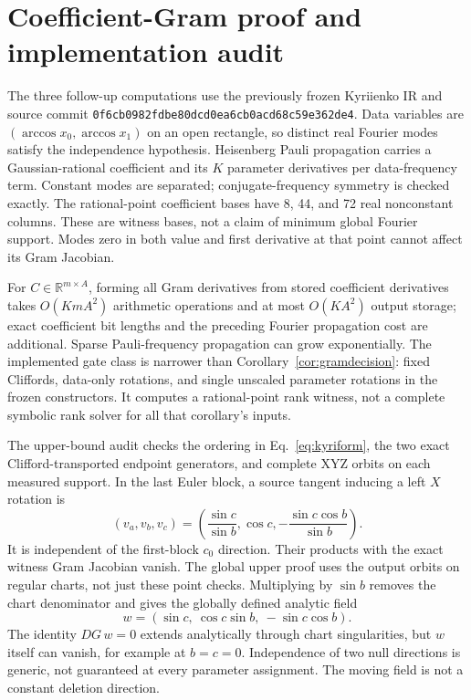 \section{Coefficient-Gram proof and implementation audit}
\label{app:gram}
The three follow-up computations use the previously frozen Kyriienko
IR and source commit \texttt{0f6cb0982fdbe80dcd0ea6cb0acd68c59e362de4}.
Data variables are $(\arccos x_0,\arccos x_1)$ on an open rectangle,
so distinct real Fourier modes satisfy the independence hypothesis.
Heisenberg Pauli propagation carries a Gaussian-rational coefficient
and its $K$ parameter derivatives per data-frequency term. Constant
modes are separated; conjugate-frequency symmetry is checked exactly.
The rational-point coefficient bases have 8, 44, and 72 real
nonconstant columns. These are witness bases, not a claim of minimum
global Fourier support. Modes zero in both value and first derivative
at that point cannot affect its Gram Jacobian.

For $C\in\mathbb R^{m\times A}$, forming all Gram derivatives from
stored coefficient derivatives takes $O(KmA^2)$ arithmetic operations
and at most $O(KA^2)$ output storage; exact coefficient bit lengths and
the preceding Fourier propagation cost are additional. Sparse
Pauli-frequency propagation can grow exponentially. The implemented
gate class is narrower than Corollary~\ref{cor:gramdecision}: fixed
Cliffords, data-only rotations, and single unscaled parameter
rotations in the frozen constructors. It computes a rational-point
rank witness, not a complete symbolic rank solver for all that
corollary's inputs.

The upper-bound audit checks the ordering in Eq.~\eqref{eq:kyriform},
the two exact Clifford-transported endpoint generators, and complete
XYZ orbits on each measured support. In the last Euler block, a
source tangent inducing a left $X$ rotation is
\begin{equation}
 (v_a,v_b,v_c)=
 \left(\frac{\sin c}{\sin b},\cos c,
       -\frac{\sin c\cos b}{\sin b}\right).
\end{equation}
It is independent of the first-block $c_0$ direction. Their products
with the exact witness Gram Jacobian vanish. The global upper proof
uses the output orbits on regular charts, not just these point checks.
Multiplying by $\sin b$ removes the chart denominator and gives the
globally defined analytic field
\begin{equation}
 w=(\sin c,\ \cos c\sin b,\ -\sin c\cos b).
\end{equation}
The identity $D G\,w=0$ extends analytically through chart singularities,
but $w$ itself can vanish, for example at $b=c=0$. Independence of
two null directions is generic, not guaranteed at every parameter
assignment. The moving field is not a constant deletion direction.

